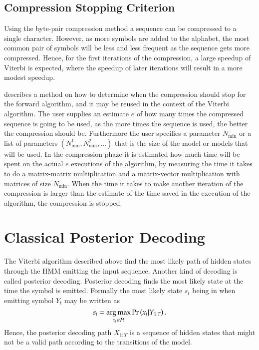 \subsection{Compression Stopping Criterion}
\label{sec:compr-stopp-crit}

Using the byte-pair compression method a sequence can be compressed to a single
character. However, as more symbols are added to the alphabet, the most common
pair of symbols will be less and less frequent as the sequence gets more
compressed. Hence, for the first iterations of the compression, a large speedup
of Viterbi is expected, where the speedup of later iterations will result in a
more modest speedup.

\citet{sand2013ziphmmlib} describes a method on how to determine when the
compression should stop for the forward algorithm, and it may be reused in the
context of the Viterbi algorithm. The user supplies an estimate $e$ of how many
times the compressed sequence is going to be used, as the more times the
sequence is used, the better the compression should be. Furthermore the user
specifies a parameter $N_{\text{min}}$ or a list of parameters
$(N_{\text{min}}^1, N_{\text{min}}^2, \dots)$ that is the size of the model or
models that will be used. In the compression phaze it is estimated how much
time will be spent on the actual $e$ executions of the algorithm, by measuring
the time it takes to do a matrix-matrix multiplication and a matrix-vector
multiplication with matrices of size $N_{\text{min}}$. When the time it takes to make
another iteration of the compression is larger than the estimate of the time
saved in the execution of the algorithm, the compression is stopped.

\section{Classical Posterior Decoding}
\label{sec:posterior-decoding-1}

The Viterbi algorithm described above find the most likely path of hidden
states through the HMM emitting the input sequence. Another kind of decoding is
called posterior decoding. Posterior decoding finds the most likely state at
the time the symbol is emitted. Formally the most likely state $s_t$ being in
when emitting symbol $Y_t$ may be written as
\begin{equation*}
  s_t = \operatorname*{arg\,max}_{x_t \in \mathcal{H}} \Pr \left(x_t | Y_{1:T} \right).
\end{equation*}
Hence, the posterior decoding path $X_{1:T}$ is a sequence of hidden states
that might not be a valid path according to the transitions of the
model. 

